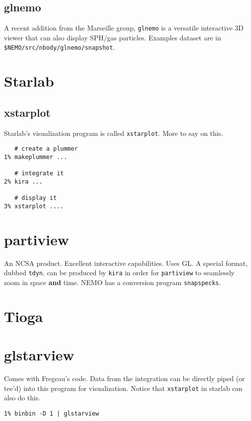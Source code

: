 \subsection{glnemo}

A recent addition from the Marseille group, {\tt glnemo} is a versatile 
interactive 3D viewer that can also display SPH/gas particles. Examples
dataset are in {\tt \$NEMO/src/nbody/glnemo/snapshot}.

\section{Starlab}
\subsection{xstarplot}

Starlab's visualization program is called {\tt xstarplot}. More to say on this.

\footnotesize\begin{verbatim}
   # create a plummer
1% makeplummer ...

   # integrate it
2% kira ...

   # display it
3% xstarplot ....
\end{verbatim}\normalsize

\section{partiview}

An NCSA product. Excellent interactive capabilities. Uses GL. A special
format, dubbed {\tt tdyn}, can be produced by {\tt kira} in order for
{\tt partiview} to seamlessly zoom in space {\bf and} time. NEMO has
a conversion program {\tt snapspecks}.

\section{Tioga}

\section{glstarview}

Comes with Fregeau's code. Data from the integration can be directly  piped
(or tee'd) into this program for visualization. Notice that {\tt xstarplot}
in starlab can also do this.

\footnotesize\begin{verbatim}
1% binbin -D 1 | glstarview
\end{verbatim}\normalsize


